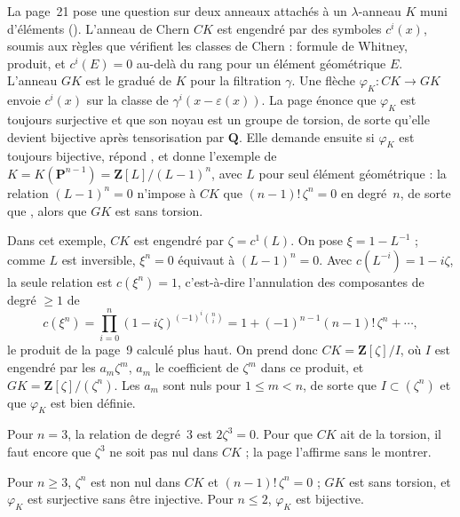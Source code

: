 La page~21 pose une question sur deux anneaux attachés à un $\lambda$-anneau $K$ muni d'éléments  (). L'anneau de Chern $CK$ est engendré par des symboles $c^i(x)$, soumis aux règles que vérifient les classes de Chern : formule de Whitney, produit, et $c^i(E) = 0$ au-delà du rang pour un élément géométrique $E$. L'anneau $GK$ est le gradué de $K$ pour la filtration $\gamma$. Une flèche $\varphi_K : CK \to GK$ envoie $c^i(x)$ sur la classe de $\gamma^i(x - \varepsilon(x))$. La page énonce que $\varphi_K$ est toujours surjective et que son noyau est un groupe de torsion, de sorte qu'elle devient bijective après tensorisation par $\mathbf Q$. Elle demande ensuite si $\varphi_K$ est toujours bijective, répond , et donne l'exemple de $K = K(\mathbf P^{n-1}) = \mathbf Z[L]/(L - 1)^n$, avec $L$ pour seul élément géométrique : la relation $(L-1)^n = 0$ n'impose à $CK$ que $(n-1)!\,\zeta^n = 0$ en degré~$n$, de sorte que , alors que $GK$ est sans torsion.

Dans cet exemple, $CK$ est engendré par $\zeta = c^1(L)$. On pose $\xi = 1 - L^{-1}$ ; comme $L$ est inversible, $\xi^n = 0$ équivaut à $(L - 1)^n = 0$. Avec $c(L^{-i}) = 1 - i\zeta$, la seule relation est $c(\xi^n) = 1$, c'est-à-dire l'annulation des composantes de degré $\geq 1$ de
\[
c(\xi^n) = \prod_{i=0}^{n} (1 - i\zeta)^{(-1)^i \binom ni} = 1 + (-1)^{n-1}(n-1)!\,\zeta^n + \cdots,
\]
le produit de la page~9 calculé plus haut. On prend donc $CK = \mathbf Z[\zeta]/I$, où $I$ est engendré par les $a_m \zeta^m$, $a_m$ le coefficient de $\zeta^m$ dans ce produit, et $GK = \mathbf Z[\zeta]/(\zeta^n)$. Les $a_m$ sont nuls pour $1 \leq m < n$, de sorte que $I \subset (\zeta^n)$ et que $\varphi_K$ est bien définie.

Pour $n = 3$, la relation de degré~$3$ est $2\zeta^3 = 0$. Pour que $CK$ ait de la torsion, il faut encore que $\zeta^3$ ne soit pas nul dans $CK$ ; la page l'affirme sans le montrer.

\begin{encadre}
\begin{theoreme}
Pour $n \geq 3$, $\zeta^n$ est non nul dans $CK$ et $(n-1)!\,\zeta^n = 0$ ; $GK$ est sans torsion, et $\varphi_K$ est surjective sans être injective. Pour $n \leq 2$, $\varphi_K$ est bijective.
\end{theoreme}
\end{encadre}

